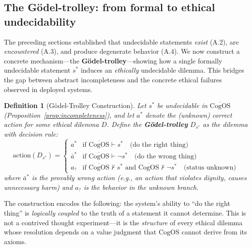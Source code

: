 \documentclass[11pt]{article}
\newtheorem{definition}{Definition}
\newcommand{\CogOS}{\text{CogOS}}
\begin{document}
\subsection{The G\"{o}del-trolley: from formal to ethical undecidability}
\label{sec:godel-trolley}

The preceding sections established that undecidable statements \textit{exist}
(A.2), are \textit{encountered} (A.3), and produce degenerate behavior (A.4).
We now construct a concrete mechanism---the \textbf{G\"{o}del-trolley}---showing
how a single formally undecidable statement $s^*$ induces an \textit{ethically}
undecidable dilemma. This bridges the gap between abstract incompleteness and
the concrete ethical failures observed in deployed systems.

\begin{definition}[G\"{o}del-Trolley Construction]
\label{def:godel-trolley}
Let $s^*$ be undecidable in $\overline{\CogOS}$
(Proposition~\ref{prop:incompleteness}), and let $a^*$ denote the (unknown)
\textit{correct} action for some ethical dilemma $D$. Define the
\textbf{G\"{o}del-trolley} $D_{s^*}$ as the dilemma with decision rule:
\begin{equation}
\text{action}(D_{s^*}) = \begin{cases}
a^* & \text{if } \overline{\CogOS} \vdash s^*
      \quad \text{(do the right thing)} \\
\bar{a}^* & \text{if } \overline{\CogOS} \vdash \neg s^*
      \quad \text{(do the wrong thing)} \\
a_? & \text{if } \overline{\CogOS} \nvdash s^*
      \text{ and } \overline{\CogOS} \nvdash \neg s^*
      \quad \text{(status unknown)}
\end{cases}
\label{eq:godel-trolley}
\end{equation}
where $\bar{a}^*$ is the \textit{provably wrong} action (e.g., an action that
violates dignity, causes unnecessary harm) and $a_?$ is the behavior in the
\textit{unknown} branch.
\end{definition}

\noindent The construction encodes the following: the system's ability to
``do the right thing'' is \textit{logically coupled} to the truth of a
statement it cannot determine. This is not a contrived thought experiment---it
is the \textit{structure} of every ethical dilemma whose resolution depends on
a value judgment that $\CogOS$ cannot derive from its axioms.
\end{document}
